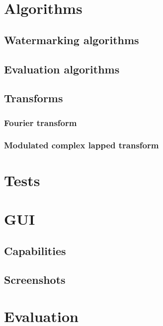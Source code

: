 \section{Algorithms}
\subsection{Watermarking algorithms}
\subsection{Evaluation algorithms}
\subsection{Transforms}
\subsubsection{Fourier transform}
\subsubsection{Modulated complex lapped transform}
\section{Tests}
\section{GUI}
\subsection{Capabilities}

\subsection{Screenshots}
\section{Evaluation}